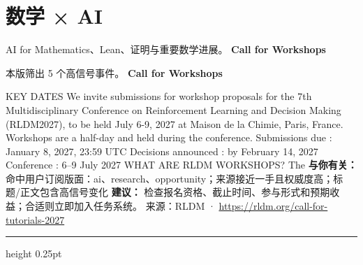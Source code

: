 \documentclass[10.5pt]{ctexart}
\begin{document}
\section*{数学 × AI}
{\color{ormuted} AI for Mathematics、Lean、证明与重要数学进展。}
\vspace{2mm}
{\LARGE\bfseries Call for Workshops}\par
\vspace{1mm}
{\color{ormuted} 本版筛出 5 个高信号事件。}
\vspace{3mm}
{\Large\bfseries Call for Workshops}\par
KEY DATES We invite submissions for workshop proposals for the 7th Multidisciplinary Conference on Reinforcement Learning and Decision Making (RLDM2027), to be held July 6-9, 2027 at Maison de la Chimie, Paris, France. Workshops are a half-day and held during the conference. Submissions due : January 8, 2027, 23:59 UTC Decisions announced : by February 14, 2027 Conference : 6–9 July 2027 WHAT ARE RLDM WORKSHOPS? The 
\textbf{与你有关：} 命中用户订阅版面：ai、research、opportunity；来源接近一手且权威度高；标题/正文包含高信号变化
\textbf{建议：} 检查报名资格、截止时间、参与形式和预期收益；合适则立即加入任务系统。
{\footnotesize\color{ormuted} 来源：RLDM · \url{https://rldm.org/call-for-tutorials-2027}}
\vspace{4mm}
\hrule height 0.25pt
\vspace{3mm}
\end{document}

